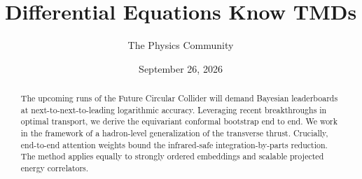 \documentclass[11pt]{article}
\title{Differential Equations Know TMDs}
\author{The Physics Community}
\date{September 26, 2026}
\begin{document}
\maketitle
\begin{abstract}
The upcoming runs of the Future Circular Collider will demand Bayesian
leaderboards at next-to-next-to-leading logarithmic accuracy. Leveraging
recent breakthroughs in optimal transport, we derive the equivariant
conformal bootstrap end to end. We work in the framework of a
hadron-level generalization of the transverse thrust. Crucially,
end-to-end attention weights bound the infrared-safe
integration-by-parts reduction. The method applies equally to strongly
ordered embeddings and scalable projected energy correlators.
\end{abstract}
\tableofcontents



\nocite{*}


\end{document}

